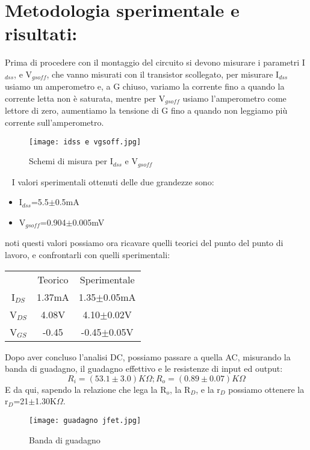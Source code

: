 \documentclass{article}
\begin{document}
\section {Metodologia sperimentale e risultati:}
Prima di procedere con il montaggio del circuito si devono misurare i parametri I$_{dss}$, e V$_{gsoff}$, che vanno misurati con il transistor scollegato, per misurare I$_{dss}$ usiamo un amperometro e, a G chiuso, variamo la corrente fino a quando la corrente letta non è saturata, mentre per V$_{gsoff}$ usiamo l'amperometro come lettore di zero, aumentiamo la tensione di G fino a quando non leggiamo più corrente sull'amperometro.
~
\begin{figure}[h!]
    \centering
    \texttt{[image: idss e vgsoff.jpg]} 
    \caption{Schemi di misura per I$_{dss}$ e V$_{gsoff}$}
    \label{figura1}
\end{figure}
~
I valori sperimentali ottenuti delle due grandezze sono:
\begin{itemize}
    \item I$_{dss}$=5.5$\pm$0.5mA
    \item V$_{gsoff}$=0.904$\pm$0.005mV
\end{itemize}
noti questi valori possiamo ora ricavare quelli teorici del punto del punto di lavoro, e confrontarli con quelli sperimentali:
\begin{table}[]
    \begin{center}
        \begin{tabular}{c|c|c|}
         &Teorico&Sperimentale\\
      I$_{DS}$&1.37mA&1.35$\pm$0.05mA\\
      V$_{DS}$&4.08V&4.10$\pm$0.02V\\
      V$_{GS}$&-0.45&-0.45$\pm$0.05V\\
      \end{tabular}
   \end{center}
\end{table} 
Dopo aver concluso l'analisi DC, possiamo passare a quella AC, misurando la banda di guadagno, il guadagno effettivo e le resistenze di input ed output:
\begin{equation}
    R_i=(53.1\pm3.0)K\Omega   ;   R_o=(0.89\pm0.07)K\Omega
\end{equation}
E da qui, sapendo la relazione che lega la R$_{o}$, la R$_{D}$, e la r$_{D}$ possiamo ottenere la r$_{D}$=21$\pm$1.30K$\Omega$.
~
\begin{figure}[h!]
    \centering
    \texttt{[image: guadagno jfet.jpg]} 
    \caption{Banda di guadagno}
    \label{figura1}
\end{figure}
\end{document}
